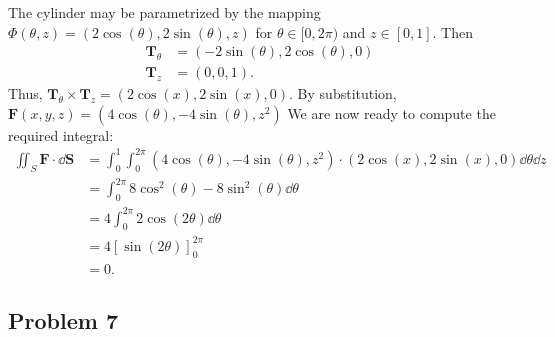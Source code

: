 \documentclass[11pt]{article}
\begin{document}
The cylinder may be parametrized by the mapping $\Phi(\theta, z) = (2 \cos(\theta), 2 \sin(\theta), z)$ for $\theta \in [0, 2\pi)$ and $z \in [0, 1]$. Then 
	\begin{align*}
	\mathbf{T}_{\theta} &= (-2 \sin(\theta), 2 \cos(\theta), 0) \\
	\mathbf{T}_{z} &= (0, 0, 1).
\end{align*}
Thus, $\mathbf{T}_{\theta} \times \mathbf{T}_{z} = (2 \cos(x), 2 \sin(x), 0)$. By substitution, $\mathbf{F}(x, y, z) = (4\cos(\theta), -4\sin(\theta), z^{2})$ We are now ready to compute the required integral:
\begin{align*}
	\iint_{S} \mathbf{F} \cdot \dd{\mathbf{S}} &= \int_{0}^{1} \int_{0}^{2\pi} (4\cos(\theta), -4\sin(\theta), z^{2}) \cdot (2 \cos(x), 2 \sin(x), 0) \dd{\theta} \dd{z} \\
	&= \int_{0}^{2\pi} 8 \cos^{2}(\theta) - 8 \sin^{2}(\theta) \dd{\theta} \\
	&= 4 \int_{0}^{2\pi} 2 \cos(2\theta) \dd{\theta} \\
	&= 4 \left[ \sin(2\theta) \right]_{0}^{2\pi} \\
	&= \boxed{0}.
\end{align*}


\subsection*{Problem 7}
\end{document}
